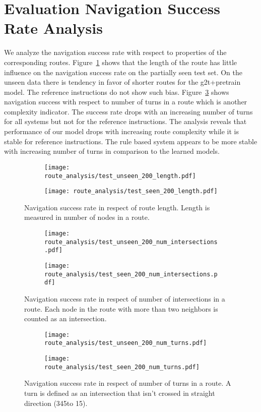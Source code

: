 \documentclass[11pt,a4paper]{article}
\begin{document}
\section{Evaluation Navigation Success Rate Analysis}
We analyze the navigation success rate with respect to properties of the corresponding routes. Figure~\ref{fig:length_success} shows that the length of the route has little influence on the navigation success rate on the partially seen test set. On the unseen data there is tendency in favor of shorter routes for the g2t+pretrain model. The reference instructions do not show such bias. Figure~\ref{fig:turns_success} shows navigation success with respect to number of turns in a route which is another complexity indicator. The success rate drops with an increasing number of turns for all systems but not for the reference instructions. The analysis reveals that performance of our model drops with increasing route complexity while it is stable for reference instructions. The rule based system appears to be more stable with increasing number of turns in comparison to the learned models.
\begin{figure}
  \centering
  \begin{subfigure}{0.49\textwidth}
  \texttt{[image: route\_analysis/test\_unseen\_200\_length.pdf]}
  \end{subfigure}
  \begin{subfigure}{0.49\textwidth}
  \texttt{[image: route\_analysis/test\_seen\_200\_length.pdf]}
  \end{subfigure}
  \caption{Navigation success rate in respect of route length. Length is measured in number of nodes in a route.}
  \label{fig:length_success}
\end{figure}
\begin{figure}
  \centering
  \begin{subfigure}{0.48\textwidth}
  \texttt{[image: route\_analysis/test\_unseen\_200\_num\_intersections.pdf]}
  \end{subfigure}
  \begin{subfigure}{0.48\textwidth}
  \texttt{[image: route\_analysis/test\_seen\_200\_num\_intersections.pdf]}
  \end{subfigure}
  \caption{Navigation success rate in respect of number of intersections in a route. Each node in the route with more than two neighbors is counted as an intersection.}
  \label{fig:intersections_success}
\end{figure}
\begin{figure}
  \centering
  \begin{subfigure}{0.48\textwidth}
  \texttt{[image: route\_analysis/test\_unseen\_200\_num\_turns.pdf]}
  \end{subfigure}
  \begin{subfigure}{0.48\textwidth}
  \texttt{[image: route\_analysis/test\_seen\_200\_num\_turns.pdf]}
  \end{subfigure}
  \caption{Navigation success rate in respect of number of turns in a route. A turn is defined as an intersection that isn't crossed in straight direction (345\degree to 15\degree).}
  \label{fig:turns_success}
\end{figure}
\end{document}
